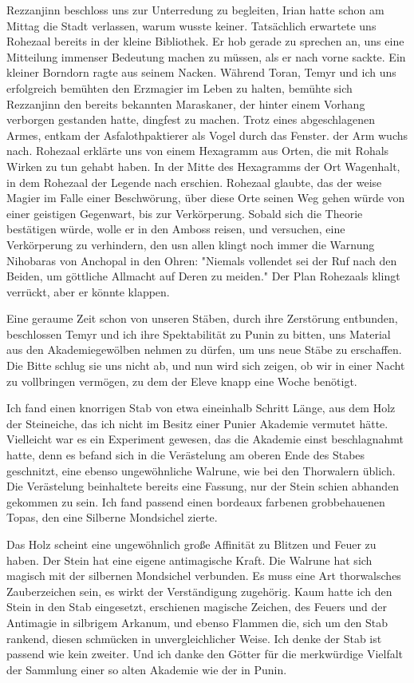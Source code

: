 Rezzanjinn beschloss uns zur Unterredung zu begleiten, Irian hatte schon am Mittag die Stadt verlassen, warum wusste keiner. Tatsächlich erwartete uns Rohezaal bereits in der kleine Bibliothek. Er hob gerade zu sprechen an, uns eine Mitteilung immenser Bedeutung machen zu müssen, als er nach vorne sackte. Ein kleiner Borndorn ragte aus seinem Nacken. Während Toran, Temyr und ich uns erfolgreich bemühten den Erzmagier im Leben zu halten, bemühte sich Rezzanjinn den bereits bekannten Maraskaner, der hinter einem Vorhang verborgen gestanden hatte, dingfest zu machen. Trotz eines abgeschlagenen Armes, entkam der Asfalothpaktierer als Vogel durch das Fenster. der Arm wuchs nach. Rohezaal erklärte uns von einem Hexagramm aus Orten, die mit Rohals Wirken zu tun gehabt haben. In der Mitte des Hexagramms der Ort Wagenhalt, in dem Rohezaal der Legende nach erschien. Rohezaal glaubte, das der weise Magier im Falle einer Beschwörung, über diese Orte seinen Weg gehen würde von einer geistigen Gegenwart, bis zur Verkörperung. Sobald sich die Theorie bestätigen würde, wolle er in den Amboss reisen, und versuchen, eine Verkörperung zu verhindern, den usn allen klingt noch immer die Warnung Nihobaras von Anchopal in den Ohren: "Niemals vollendet sei der Ruf nach den Beiden, um göttliche Allmacht auf Deren zu meiden." Der Plan Rohezaals klingt verrückt, aber er könnte klappen.

Eine geraume Zeit schon von unseren Stäben, durch ihre Zerstörung entbunden, beschlossen Temyr und ich ihre Spektabilität zu Punin zu bitten, uns Material aus den Akademiegewölben nehmen zu dürfen, um uns neue Stäbe zu erschaffen. Die Bitte schlug sie uns nicht ab, und nun wird sich zeigen, ob wir in einer Nacht zu vollbringen vermögen, zu dem der Eleve knapp eine Woche benötigt.

Ich fand einen knorrigen Stab von etwa eineinhalb Schritt Länge, aus dem Holz der Steineiche, das ich nicht im Besitz einer Punier Akademie vermutet hätte. Vielleicht war es ein Experiment gewesen, das die Akademie einst beschlagnahmt hatte, denn es befand sich in die Verästelung am oberen Ende des Stabes geschnitzt, eine ebenso ungewöhnliche Walrune, wie bei den Thorwalern üblich. Die Verästelung beinhaltete bereits eine Fassung, nur der Stein schien abhanden gekommen zu sein. Ich fand passend einen bordeaux farbenen grobbehauenen Topas, den eine Silberne Mondsichel zierte.

Das Holz scheint eine ungewöhnlich große Affinität zu Blitzen und Feuer zu haben. Der Stein hat eine eigene antimagische Kraft. Die Walrune hat sich magisch mit der silbernen Mondsichel verbunden. Es muss eine Art thorwalsches Zauberzeichen sein, es wirkt der Verständigung zugehörig. Kaum hatte ich den Stein in den Stab eingesetzt, erschienen magische Zeichen, des Feuers und der Antimagie in silbrigem Arkanum, und ebenso Flammen die, sich um den Stab rankend, diesen schmücken in unvergleichlicher Weise. Ich denke der Stab ist passend wie kein zweiter. Und ich danke den Götter für die merkwürdige Vielfalt der Sammlung einer so alten Akademie wie der in Punin.

